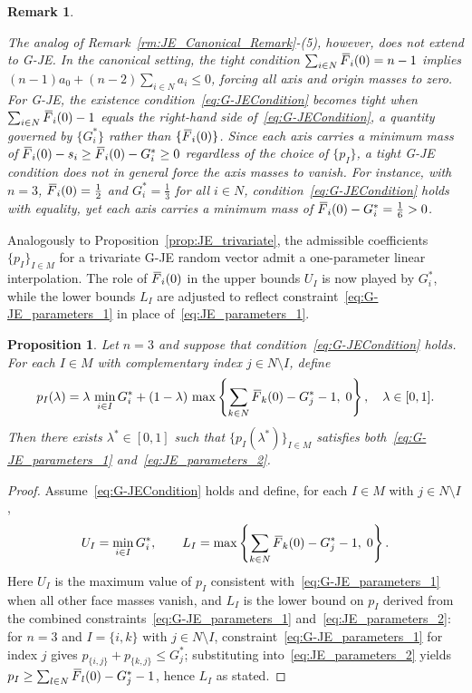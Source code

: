 \documentclass[letterpaper,12pt]{article}
\numberwithin{equation}{section}
\newtheorem{remark}[theorem]{Remark}
\newtheorem{proposition}[theorem]{Proposition}
\newcommand{\N}{{N}}
\newcommand{\M}{{M}}
\newcommand{\I}{{I}}
\newcommand{\F}{\,\overline{\kern-0.175em F\kern-0em}}
\begin{document}
{\begin{remark}
\begin{itemize}
The analog of Remark~\ref{rm:JE_Canonical_Remark}-(5), however, does not
extend to G-JE. In the canonical setting, the tight condition
$\sum_{i\in\N}\F_i(0)=n-1$ implies $(n-1)a_0+(n-2)\sum_{i\in\N}a_i\le0$,
forcing all axis and origin masses to zero. For G-JE, the existence
condition~\eqref{eq:G-JECondition} becomes tight when
$\sum_{i\in\N}\F_i(0)-1$ equals the right-hand side of~\eqref{eq:G-JECondition},
a quantity governed by $\{G_i^*\}$ rather than $\{\F_i(0)\}$. Since each axis
carries a minimum mass of $\F_i(0)-s_i\ge\F_i(0)-G_i^*\ge0$ regardless of
the choice of $\{p_\I\}$, a tight G-JE condition does not in general force
the axis masses to vanish. For instance, with $n=3$, $\F_i(0)=\tfrac{1}{2}$
and $G_i^*=\tfrac{1}{3}$ for all $i\in\N$,
condition~\eqref{eq:G-JECondition} holds with equality, yet each axis
carries a minimum mass of $\F_i(0)-G_i^*=\tfrac{1}{6}>0$.
\end{itemize}
\end{remark}

Analogously to Proposition~\ref{prop:JE_trivariate}, the admissible coefficients
$\{p_\I\}_{\I\in\M}$ for a trivariate G-JE random vector admit a one-parameter
linear interpolation. The role of $\F_i(0)$ in the upper bounds $U_\I$ is now
played by $G_i^*$, while the lower bounds $L_\I$ are adjusted to reflect
constraint~\eqref{eq:G-JE_parameters_1} in place of~\eqref{eq:JE_parameters_1}.

\begin{proposition}
\label{prop:G-JE_trivariate}
Let $n=3$ and suppose that condition~\eqref{eq:G-JECondition} holds. For each
$\I\in\M$ with complementary index $j\in\N\setminus\I$, define
\begin{equation}
\label{eq:G-JE_trivariate_P}
p_{\I}(\lambda)
=\lambda\,\min_{i\in\I}G_i^*
+(1-\lambda)\,\max\left\{\sum_{k\in\N}\F_k(0)-G_j^*-1,\;0\right\},
\quad\lambda\in[0,1].
\end{equation}
Then there exists $\lambda^*\in[0,1]$ such that $\{p_\I(\lambda^*)\}_{\I\in\M}$
satisfies both~\eqref{eq:G-JE_parameters_1} and~\eqref{eq:JE_parameters_2}.
\end{proposition}

\begin{proof}
Assume~\eqref{eq:G-JECondition} holds and define, for each $\I\in\M$ with
$j\in\N\setminus\I$,
\[
U_\I=\min_{i\in\I}G_i^*,\qquad
L_\I=\max\left\{\sum_{k\in\N}\F_k(0)-G_j^*-1,\;0\right\}.
\]
Here $U_\I$ is the maximum value of $p_\I$ consistent
with~\eqref{eq:G-JE_parameters_1} when all other face masses vanish, and
$L_\I$ is the lower bound on $p_\I$ derived from the combined
constraints~\eqref{eq:G-JE_parameters_1} and~\eqref{eq:JE_parameters_2}: for
$n=3$ and $\I=\{i,k\}$ with $j\in\N\setminus\I$, constraint~\eqref{eq:G-JE_parameters_1}
for index $j$ gives $p_{\{i,j\}}+p_{\{k,j\}}\le G_j^*$; substituting
into~\eqref{eq:JE_parameters_2} yields $p_\I\ge\sum_{l\in\N}\F_l(0)-G_j^*-1$,
hence $L_\I$ as stated.


\end{proof}}
\end{document}
